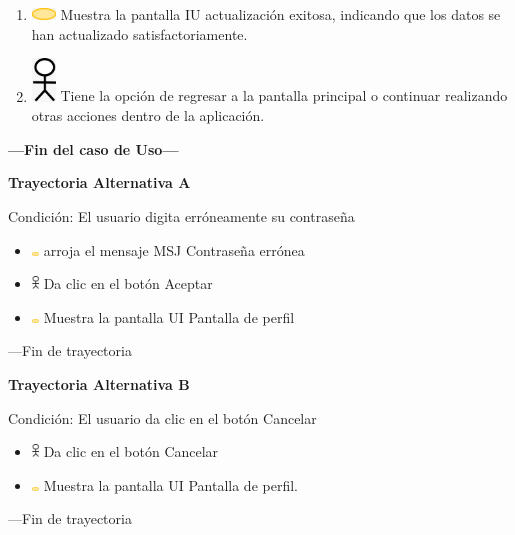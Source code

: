 \begin{enumerate}
    \item \includegraphics[width=0.0500\textwidth]{Figuras/sistema.png} Muestra la pantalla IU actualización exitosa, indicando que los datos se han actualizado satisfactoriamente.
    \item \includegraphics[width=0.0500\textwidth]{Figuras/persona.png} Tiene la opción de regresar a la pantalla principal o continuar realizando otras acciones dentro de la aplicación.
    
\end{enumerate}
\textbf{---Fin del caso de Uso---}
\vspace{15pt}

\textbf{Trayectoria Alternativa A}

Condición: El usuario digita erróneamente su contraseña 

\begin{itemize}
    \item \includegraphics[width=0.0150\textwidth]{Figuras/sistema.png} arroja el mensaje MSJ Contraseña errónea
    \item \includegraphics[width=0.01500\textwidth]{Figuras/persona.png} Da clic en el botón Aceptar
  \item \includegraphics[width=0.0150\textwidth]{Figuras/sistema.png} Muestra la pantalla UI Pantalla de perfil
    
\end{itemize}
---Fin de trayectoria

\vspace{15pt}

\textbf{Trayectoria Alternativa B}

Condición: El usuario da clic en el botón Cancelar
\begin{itemize}
    \item \includegraphics[width=0.0150\textwidth]{Figuras/persona.png} Da clic en el botón Cancelar
    \item \includegraphics[width=0.01500\textwidth]{Figuras/sistema.png} Muestra la pantalla UI Pantalla de perfil.
\end{itemize}
---Fin de trayectoria


